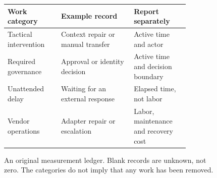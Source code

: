 \begin{figure}[htbp]
\centering\small
\begin{tabular}{|p{0.25\linewidth}|p{0.34\linewidth}|p{0.26\linewidth}|}
\hline
\textbf{Work category} & \textbf{Example record} & \textbf{Report separately} \\
\hline
Tactical intervention & Context repair or manual transfer & Active time and actor \\
\hline
Required governance & Approval or identity decision & Active time and decision boundary \\
\hline
Unattended delay & Waiting for an external response & Elapsed time, not labor \\
\hline
Vendor operations & Adapter repair or escalation & Labor, maintenance and recovery cost \\
\hline
\end{tabular}
\caption{An original measurement ledger. Blank records are unknown, not zero. The categories do not imply that any work has been removed.}
\label{fig:effort-ledger}
\end{figure}
